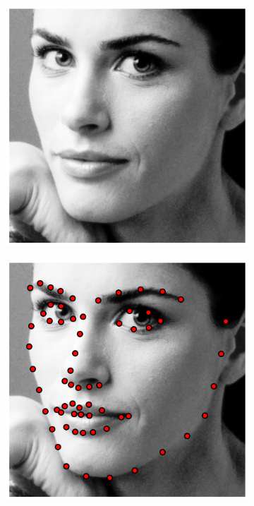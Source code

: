\begin{figure}[t!]
    \centering
    \begin{subfigure}[b]{0.145\textwidth}
            \includegraphics[width=\textwidth]{resources/Fig_Intro/intro_0_0}
    \end{subfigure}
    \hfill
    \begin{subfigure}[b]{0.145\textwidth}
            \includegraphics[width=\textwidth]{resources/Fig_Intro/intro_0_1}

\end{subfigure}
\end{figure}
